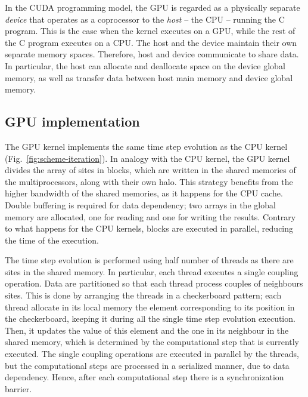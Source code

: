In the CUDA programming model, the GPU is regarded as a physically separate \textit{device} that operates as a coprocessor to the \textit{host} -- the CPU -- running the C program. This is the case when the kernel executes on a GPU, while the rest of the C program executes on a CPU. The host and the device maintain their own separate memory spaces. Therefore, host and device communicate to share data. In particular, the host can allocate and deallocate space on the device global memory, as well as transfer data between host main memory and device global memory.

\subsection{GPU implementation}
The GPU kernel implements the same time step evolution as the CPU kernel (Fig.~\ref{fig:scheme-iteration}). In analogy with the CPU kernel, the  GPU kernel divides the array of sites in blocks, which are written in the shared memories of the multiprocessors, along with their own halo. This strategy benefits from the higher bandwidth of the shared memories, as it happens for the CPU cache. Double buffering is required for data dependency; two arrays in the global memory are allocated, one for reading and one for writing the results. Contrary to what happens for the CPU kernels, blocks are executed in parallel, reducing the time of the execution. 

The time step evolution is performed using half number of threads as there are sites in the shared memory. In particular, each thread executes a single coupling operation. Data are partitioned so that each thread process couples of neighbours sites. This is done by arranging the threads in a checkerboard pattern; each thread allocate in its local memory the element corresponding to its position in the checkerboard, keeping it during all the single time step evolution execution. Then, it updates the value of this element and the one in its neighbour in the shared memory, which is determined by the computational step that is currently executed. The single coupling operations are executed in parallel by the threads, but the computational steps are processed in a serialized manner, due to data dependency. Hence, after each computational step there is a synchronization barrier. 

